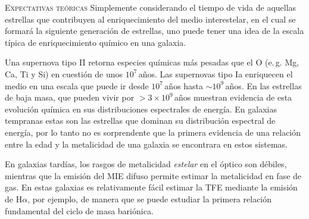 \documentclass[xcolor=dvipsnames,4pt,hyperref={colorlinks,citecolor=black,linkcolor=black,urlcolor=black}]{beamer}
\begin{document}
\begin{frame}[allowframebreaks]{\textsc{Expectativas teóricas}}
%
Simplemente considerando el tiempo de vida de aquellas estrellas que contribuyen al enriquecimiento
del medio interestelar, en el cual se formará la siguiente generación de estrellas, uno puede tener
una idea de la escala típica de enriquecimiento químico en una galaxia.

Una supernova tipo II retorna especies químicas más pesadas que el O (e.\,g. Mg, Ca, Ti y Si) en
cuestión de unos $10^7\,$años.
Las supernovas tipo Ia enriquecen el medio en una escala que puede ir desde $10^7\,$años hasta
$\sim10^9\,$años.
En las estrellas de baja masa, que pueden vivir por $>3\times10^9\,$años muestran evidencia de esta
evolución química en sus distribuciones espectrales de energía.
En galaxias tempranas estas son las estrellas que dominan su distribución espectral de energía, por
lo tanto no es sorprendente que la primera evidencia de una relación entre la edad y la metalicidad
de una galaxia se encontrara en estos sistemas.

En galaxias tardías, los rasgos de metalicidad \emph{estelar} en el óptico son débiles, mientras que
la emisión del MIE difuso permite estimar la metalicidad en fase de gas.
En estas galaxias es relativamente fácil estimar la TFE mediante la emisión de H$\alpha$, por
ejemplo, de manera que se puede estudiar la primera relación fundamental del ciclo de masa
bariónica.

\end{frame}
\end{document}
